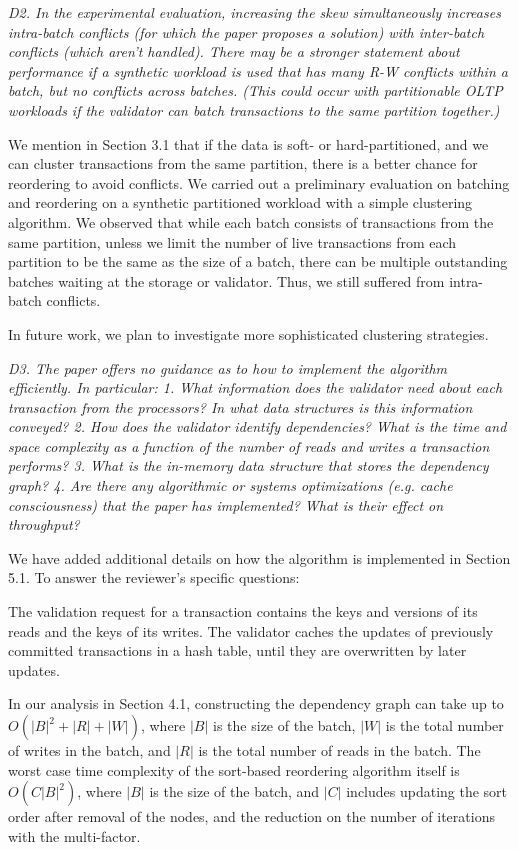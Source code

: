 \documentclass{article}
\begin{document}
\emph{D2. In the experimental evaluation, increasing the skew simultaneously increases intra-batch conflicts (for which the paper proposes a solution) with inter-batch conflicts (which aren't handled). There may be a stronger statement about performance if a synthetic workload is used that has many R-W conflicts within a batch, but no conflicts across batches. (This could occur with partitionable OLTP workloads if the validator can batch transactions to the same partition together.)}

We mention in Section 3.1 that if the data is soft- or hard-partitioned, and we can cluster transactions from the same partition, there is a better chance for reordering to avoid conflicts. We carried out a preliminary evaluation on batching and reordering on a synthetic partitioned workload with a simple clustering algorithm. We observed that while each batch consists of transactions from the same partition, unless we limit the number of live transactions from each partition to be the same as the size of a batch, there can be multiple outstanding batches waiting at the storage or validator. Thus, we still suffered from intra-batch conflicts. 

In future work, we plan to investigate more sophisticated clustering strategies.

\emph{D3. The paper offers no guidance as to how to implement the algorithm efficiently. In particular:
	1. What information does the validator need about each transaction from the processors? In what data structures is this information conveyed?
	2. How does the validator identify dependencies? What is the time and space complexity as a function of the number of reads and writes a transaction performs?
	3. What is the in-memory data structure that stores the dependency graph? 
	4. Are there any algorithmic or systems optimizations (e.g. cache consciousness) that the paper has implemented? What is their effect on throughput?}

We have added additional details on how the algorithm is implemented in Section 5.1. To answer the reviewer's specific questions:

The validation request for a transaction contains the keys and versions of its reads and the keys of its writes. The validator caches the updates of previously committed transactions in a hash table, until they are overwritten by later updates. 

In our analysis in Section 4.1, constructing the dependency graph can take up to $O(|B|^2+|R|+|W|)$, where $|B|$ is the size of the batch, $|W|$ is the total number of writes in the batch, and $|R|$ is the total number of reads in the batch. The worst case  time complexity of the sort-based reordering algorithm itself is $O(C|B|^2)$, where $|B|$ is the size of the batch, and $|C|$ includes updating the sort order after removal of the nodes, and the reduction on the number of iterations with the multi-factor. 
\end{document}
